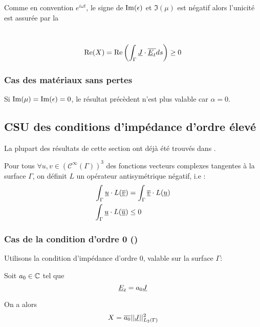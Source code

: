 Comme en convention $e^{i\omega t}$, le signe de $\operatorname{Im}(\epsilon)$ et $\Im(\mu)$ est négatif
alors l'unicité est assurée par la
\begin{defn}~\\
\begin{equation}\label{eq:unicite:form_var:cgu}
\operatorname{Re}(X) = \operatorname{Re}\left(\int_\Gamma \underline{J} \cdot {\overline{\underline{E}_t}} ds\right) \ge 0
\end{equation}
\end{defn}

\subsubsection{Cas des matériaux sans pertes}

Si $\operatorname{Im}(\mu) = \operatorname{Im}(\epsilon) = 0$, le résultat précèdent n'est plus valable car $\alpha = 0$.


\subsection{CSU des conditions d'impédance d'ordre élevé}

La plupart des résultats de cette section ont déjà été trouvés dans \cite{stupfel_sufficient_2011}.


Pour tous $\forall u, v \in (\mathcal C^\infty(\Gamma))^3$ des fonctions vecteurs complexes tangentes à la surface $\Gamma$, on définit $L$ un opérateur antisymétrique négatif, i.e : 
\begin{align*}
\int_\Gamma \underline{u}\cdot L({\overline{\underline{v}}}) &= \int_\Gamma {\overline{\underline{v}}}\cdot L(\underline{u})\\
\int_\Gamma \underline{u}\cdot L({\overline{\underline{u}}}) &\le 0
\end{align*}

\subsubsection{Cas de la condition d'ordre 0 (\cite{stupfel_sufficient_2011})}
Utilisons la condition d’impédance d'ordre 0, valable sur la surface $\Gamma$: 

Soit $a_0 \in \mathbb C$ tel que
\[
\underline{E}_t = a_0 \underline{J}
\]

On a alors
\begin{equation*}
X = {\overline{a_0}}||\underline{J}||_{L_2(\Gamma)}^2
\end{equation*}

